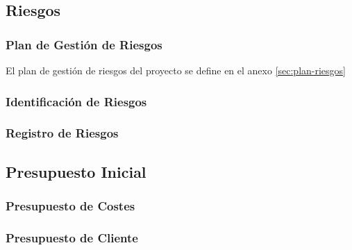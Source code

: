 \subsection{Riesgos}\label{sec:riesgos}

\subsubsection{Plan de Gestión de Riesgos} 
El plan de gestión de riesgos del proyecto se define en el anexo \ref{sec:plan-riesgos}

\subsubsection{Identificación de Riesgos}

\subsubsection{Registro de Riesgos} 



\subsection{Presupuesto Inicial}

\subsubsection{Presupuesto de Costes}

\subsubsection{Presupuesto de Cliente} 


%
%
%


